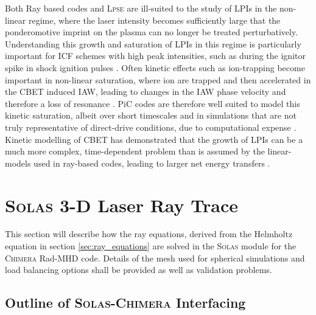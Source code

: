 Both Ray based codes and \textsc{Lpse} are ill-suited to the study of \ac{LPIs} in the non-linear regime, where the laser intensity becomes sufficiently large that the ponderomotive imprint on the plasma can no longer be treated perturbatively.
Understanding this growth and saturation of \ac{LPIs} in this regime is particularly important for \ac{ICF} schemes with high peak intensities, such as during the ignitor spike in shock ignition pulses \cite{perkins_shock_2009}.
Often kinetic effects such as ion-trapping become important in non-linear saturation, where ion are trapped and then accelerated in the \ac{CBET} induced \ac{IAW}, leading to changes in the \ac{IAW} phase velocity and therefore a loss of resonance \cite{nguyen_cross-beam_2021}.
\ac{PiC} codes are therefore well suited to model this kinetic saturation, albeit over short timescales and in simulations that are not truly representative of direct-drive conditions, due to computational expense \cite{seaton_cross-beam_2022-1}.
Kinetic modelling of \ac{CBET} has demonstrated that the growth of \ac{LPIs} can be a much more complex, time-dependent problem than is assumed by the linear-models used in ray-based codes, leading to larger net energy transfers \cite{seaton_cross-beam_2022}.

\section{\textsc{Solas} 3-D Laser Ray Trace}

This section will describe how the ray equations, derived from the Helmholtz equation in section \ref{sec:ray_equations} are solved in the \textsc{Solas} module for the \textsc{Chimera} \ac{Rad-MHD} code.
Details of the mesh used for spherical simulations and load balancing options shall be provided as well as validation problems.

\subsection{Outline of \textsc{Solas}-\textsc{Chimera} Interfacing}

